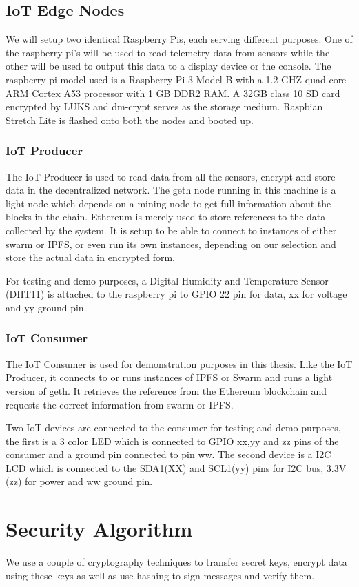 \documentclass[11pt,openright]{report}
\begin{document}
\subsection{IoT Edge Nodes}
We will setup two identical Raspberry Pis, each serving different purposes. One of the raspberry pi's will be used to read telemetry data from sensors while the other will be used to output this data to a display device or the console.
The raspberry pi model used is a Raspberry Pi 3 Model B with a 1.2 GHZ quad-core ARM Cortex A53 processor with 1 GB DDR2 RAM. A 32GB class 10 SD card encrypted by LUKS and dm-crypt serves as the storage medium. Raspbian Stretch Lite is flashed onto both the nodes and booted up.

\subsubsection{IoT Producer}
The IoT Producer is used to read data from all the sensors, encrypt and store data in the decentralized network. The geth node running in this machine is a light node which depends on a mining node to get full information about the blocks in the chain. Ethereum is merely used to store references to the data collected by the system. It is setup to be able to connect to instances of either swarm or IPFS, or even run its own instances, depending on our selection and store the actual data in encrypted form.

For testing and demo purposes, a Digital Humidity and Temperature Sensor (DHT11) is attached to the raspberry pi to GPIO 22 pin for data, xx for voltage and yy ground pin.

\subsubsection{IoT Consumer}
The IoT Consumer is used for demonstration purposes in this thesis. Like the IoT Producer, it connects to or runs instances of IPFS or Swarm and runs a light version of geth. It retrieves the reference from the Ethereum blockchain and requests the correct information from swarm or IPFS.

Two IoT devices are connected to the consumer for testing and demo purposes, the first is a 3 color LED which is connected to GPIO xx,yy and zz pins of the consumer and a ground pin connected to pin ww. The second device is a I2C LCD which is connected to the SDA1(XX) and SCL1(yy) pins for I2C bus, 3.3V (zz) for power and ww ground pin.

\section{Security Algorithm}
We use a couple of cryptography techniques to transfer secret keys, encrypt data using these keys as well as use hashing to sign messages and verify them.
\end{document}

